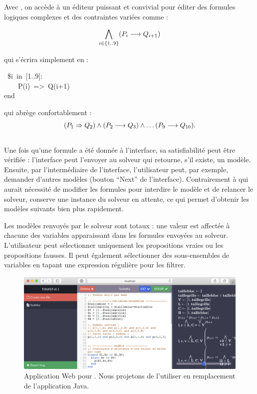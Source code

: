 Avec \touist , on accède à un éditeur puissant et convivial pour éditer des formules logiques complexes et des contraintes variées comme :

\[\bigwedge_{i \in \{1..9\}} (P_i \longrightarrow Q_{i+1})\]

\noindent
qui s'écrira simplement en \touist :
\begin{mdpre}%
~{\$i}~{in}~{}[{1}..{9}]:\\
~~~~P(i)~=\textgreater{}~Q(i+{1})\\
{end}%
\end{mdpre}%

\noindent
qui abrège confortablement :\\

\[(P_1 \Rightarrow Q_2) \wedge (P_2 \longrightarrow Q_3) \wedge \ldots (P_9\longrightarrow Q_{10}).\] 
\\


Une fois qu'une formule a été donnée à l'interface, sa satisfiabilité peut être vérifiée : l'interface peut l'envoyer au solveur qui retourne, s'il existe, un modèle. %
Ensuite, par l'intermédiaire de l'interface, l'utilisateur peut, par exemple, demander d'autres modèles (bouton \enquote{Next} de l'interface). Contrairement à \satoulouse qui aurait nécessité de modifier les formules pour interdire le modèle et de relancer le solveur, \touist conserve une instance du solveur en attente, ce qui permet d'obtenir les modèles suivants bien plus rapidement.

Les modèles renvoyés par le solveur sont totaux : une valeur est affectée à chacune des variables apparaissant dans les formules envoyées au solveur. L'utilisateur peut sélectionner uniquement les propositions vraies ou les propositions fausses. Il peut également sélectionner des sous-ensembles de variables en tapant une expression régulière pour les filtrer.


\begin{figure}[!ht] \centering
  \includegraphics[width=1\textwidth]{figures/touist-web}
  \caption{Application Web pour \touist. Nous projetons de l'utiliser en remplacement de l'application Java.} \label{fig:touist-web}
\end{figure}

